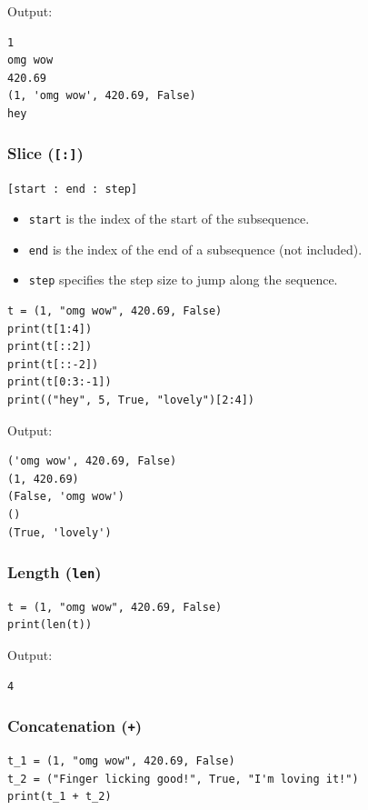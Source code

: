 \documentclass[11pt]{article}
\begin{document}
 \noindent Output:

\begin{verbatim}
1
omg wow
420.69
(1, 'omg wow', 420.69, False)
hey
\end{verbatim}


 \newpage

\subsubsection{Slice (\texttt{[:]})}
\label{sec:orgcc91072}
\texttt{[start : end : step]}
\begin{itemize}
\item \texttt{start} is the index of the start of the subsequence.
\item \texttt{end} is the index of the end of a subsequence (not included).
\item \texttt{step} specifies the step size to jump along the sequence.
\end{itemize}

\begin{verbatim}
t = (1, "omg wow", 420.69, False)
print(t[1:4])
print(t[::2])
print(t[::-2])
print(t[0:3:-1])
print(("hey", 5, True, "lovely")[2:4])
\end{verbatim}

 \noindent Output:

\begin{verbatim}
('omg wow', 420.69, False)
(1, 420.69)
(False, 'omg wow')
()
(True, 'lovely')
\end{verbatim}

\subsubsection{Length (\texttt{len})}
\label{sec:org86b1ad7}
\begin{verbatim}
t = (1, "omg wow", 420.69, False)
print(len(t))
\end{verbatim}

 \noindent Output:

\begin{verbatim}
4
\end{verbatim}

\subsubsection{Concatenation (\texttt{+})}
\label{sec:org245ee64}
\begin{verbatim}
t_1 = (1, "omg wow", 420.69, False)
t_2 = ("Finger licking good!", True, "I'm loving it!")
print(t_1 + t_2)
\end{verbatim}
\end{document}
